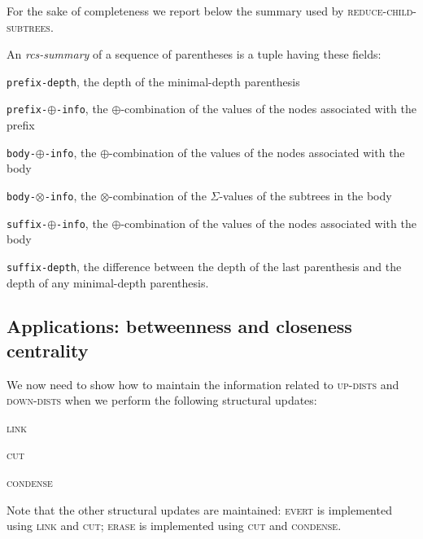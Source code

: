 \documentclass[a4paper,USenglish]{lipics}
\newcommand{\var}[1]{\textrm{\texttt{#1}}}
\begin{document}
For the sake of completeness we report below the summary used by \textsc{reduce-child-subtrees}. 
\begin{definition}
An \emph{rcs-summary} of a sequence of parentheses is a tuple having these fields:
\begin{compactitem}
	\item {{\var{prefix-depth}}}, the depth of the minimal-depth parenthesis
	\item {{\var{prefix-$\oplus$-info}}}, the $\oplus$-combination of the values of the nodes associated with the prefix 
	\item {{\var{body-$\oplus$-info}}}, the $\oplus$-combination of the values of the nodes associated with the body
	\item {{\var{body-$\otimes$-info}}}, the $\otimes$-combination of the $\Sigma$-values of the subtrees in the body
	\item {{\var{suffix-$\oplus$-info}}}, the $\oplus$-combination of the values of the nodes associated with the body
	\item {{\var{suffix-depth}}}, the difference between the depth of the last parenthesis and the depth of any minimal-depth parenthesis.
\end{compactitem}
\end{definition}

\subsection{Applications: betweenness and closeness centrality}





We now need to show how to maintain the information related to \textsc{up-dists} and \textsc{down-dists} when we perform the following structural updates:
	\begin{compactitem}
		\item \textsc{link}
		\item \textsc{cut}
		\item \textsc{condense}
	\end{compactitem}
	Note that the other structural updates are maintained: \textsc{evert} is implemented using \textsc{link} and  \textsc{cut}; \textsc{erase} is implemented using \textsc{cut} and  \textsc{condense}.
\end{document}
